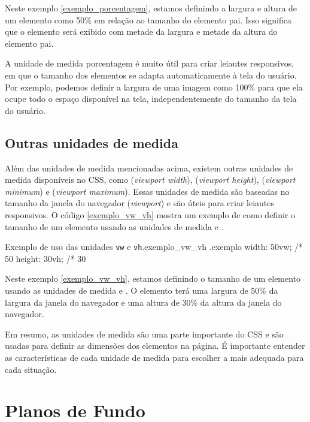Neste exemplo \ref{exemplo_porcentagem}, estamos definindo a largura e altura de um elemento como 50\% em relação ao tamanho do elemento pai. Isso significa que o elemento será exibido com metade da largura e metade da altura do elemento pai.

A unidade de medida porcentagem é muito útil para criar leiautes responsivos, em que o tamanho dos elementos se adapta automaticamente à tela do usuário. Por exemplo, podemos definir a largura de uma imagem como 100\% para que ela ocupe todo o espaço disponível na tela, independentemente do tamanho da tela do usuário.

\subsection{Outras unidades de medida}

Além das unidades de medida mencionadas acima, existem outras unidades de medida disponíveis no CSS, como  (\textit{viewport width}),  (\textit{viewport height}),  (\textit{viewport minimum}) e  (\textit{viewport maximum}). Essas unidades de medida são baseadas no tamanho da janela do navegador (\textit{viewport}) e são úteis para criar leiautes responsivos. O código \ref{exemplo_vw_vh} mostra um exemplo de como definir o tamanho de um elemento usando as unidades de medida  e .

\begin{csscode}{Exemplo de uso das unidades \texttt{vw} e \texttt{vh}.}{exemplo_vw_vh}
.exemplo {
    width: 50vw; /* 50%
    height: 30vh; /* 30%
}
\end{csscode}

Neste exemplo \ref{exemplo_vw_vh}, estamos definindo o tamanho de um elemento usando as unidades de medida  e . O elemento terá uma largura de 50\% da largura da janela do navegador e uma altura de 30\% da altura da janela do navegador.

Em resumo, as unidades de medida são uma parte importante do CSS e são usadas para definir as dimensões dos elementos na página. É importante entender as características de cada unidade de medida para escolher a mais adequada para cada situação.

\section{Planos de Fundo}

